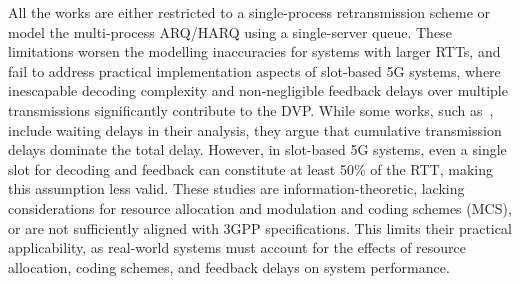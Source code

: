 All the works are either restricted to a single-process retransmission scheme or model the multi-process ARQ/HARQ using a single-server queue. 
These limitations worsen the modelling inaccuracies for systems with larger RTTs, and fail to address practical implementation aspects of slot-based 5G systems, where inescapable decoding complexity and non-negligible feedback delays over multiple transmissions significantly contribute to the DVP.
While some works, such as~\cite{Sahin2019Harq}, include waiting delays in their analysis, they argue that cumulative transmission delays dominate the total delay. However, in slot-based 5G systems, even a single slot for decoding and feedback can constitute at least 50\% of the RTT, making this assumption less valid.
These studies are information-theoretic, lacking considerations for resource allocation and modulation and coding schemes (MCS), or are not sufficiently aligned with 3GPP specifications.
This limits their practical applicability, as real-world systems must account for the effects of resource allocation, coding schemes, and feedback delays on system performance.